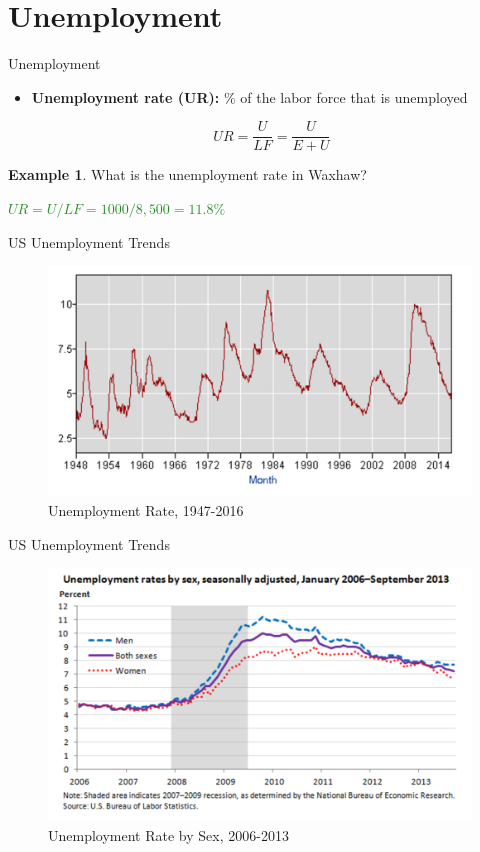 \documentclass[xcolor={dvipsnames},pdf, hyperref={colorlinks=true, citecolor=ForestGreen, linkcolor=BlueViolet, urlcolor=Magenta}]{beamer}
\theoremstyle{definition}
\newtheorem{exmp}{Example}[section]
\newcommand{\defn}[1]{\textbf{#1}}
\newcommand{\ddp}[1]{{\textcolor{ForestGreen}{#1}}}
\begin{document}
\section{Unemployment}

\begin{frame}{Unemployment}
\begin{itemize}
	 \item \defn{Unemployment rate (UR):} \% of the labor force that is unemployed  
	
	\[UR = \frac{U}{LF} = \frac{U}{E + U}\]
\end{itemize}

\begin{exmp}
	What is the unemployment rate in Waxhaw?
\end{exmp}

	\ddp{\pause $UR= U/LF = 1000/8,500 = 11.8\%$}

\end{frame}

\begin{frame}{US Unemployment Trends}
	\begin{figure}
		\centering
		\includegraphics[scale=.5]{01C_11.png}
		\caption{Unemployment Rate, 1947-2016}
	\end{figure}
\end{frame}

\begin{frame}{US Unemployment Trends}
	\begin{figure}
		\centering
		\includegraphics[scale=.6]{01C_3.png}
		\caption{Unemployment Rate by Sex, 2006-2013}
	\end{figure}
\end{frame}
\end{document}
